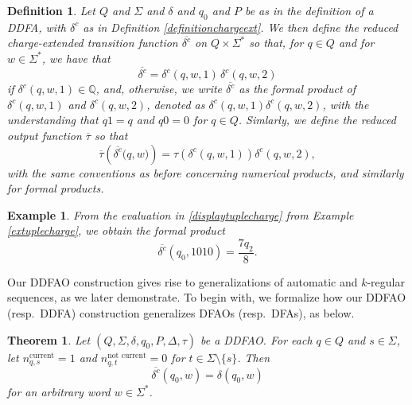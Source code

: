 \documentclass[12pt]{article}
\newtheorem{theorem}{Theorem}
\newtheorem{definition}{Definition}
\newtheorem{example}{Example}
\begin{document}
\begin{definition}\label{reduceddefinition}
 Let $Q$ and $\Sigma$ and $\delta$ and $q_0$ and $P$ be as in the definition of a DDFA, with $\delta^{c}$ as in Definition 
 \ref{definitionchargeext}. We then define the \emph{reduced charge-extended transition function} $\overline{\delta^{c}}$ on $Q 
 \times \Sigma^{\ast}$ so that, for $q \in Q$ and for $w \in \Sigma^{\ast}$, we have that 
 $$\overline{\delta^{c}} = \delta^{c}(q, w, 1) \, \delta^{c}(q, w, 2) $$ 
 if $ \delta^{c}(q, w, 1) \in \mathbb{Q}$, 
 and, otherwise, we write 
 $\overline{\delta^{c}} $ as the formal product 
 of $ \delta^{c}(q, w, 1) $ and $\delta^{c}(q, w, 2)$, denoted as 
 $ \delta^{c}(q, w, 1) \delta^{c}(q, w, 2)$, 
 with the understanding that $q 1 = q$ and $q 0 = 0$ for $q \in Q$. 
 Simlarly, we define the \emph{reduced output function}
 $\overline{\tau}$ so that
 $$ \overline{\tau}\left( \overline{\delta^{c}}\big( q, w \big) \right) 
 = \tau\left( \delta^{c}(q, w, 1) \right) \delta^{c}(q, w, 2), $$
 with the same conventions as before concerning numerical products, and similarly for formal products. 
\end{definition}

\begin{example}
 From the evaluation in \eqref{displaytuplecharge} from Example \ref{extuplecharge}, we obtain the formal product 
\begin{equation*}
 \overline{\delta^{c}}(q_0, 1010) = \frac{7q_2}{8}. 
\end{equation*}
\end{example}

 Our DDFAO construction gives rise to generalizations of automatic and $k$-regular sequences, 
 as we later demonstrate. 
 To begin with, we formalize how 
 our DDFAO (resp.\ DDFA) construction generalizes DFAOs (resp.\ DFAs), as below. 

\begin{theorem}\label{theoremmainformalize}
 Let $(Q, \Sigma, \delta, q_0, P, \Delta, \tau)$ be a DDFAO. For each $q \in Q$ and $s \in \Sigma$, let 
 $ n^{\text{current}}_{q, s} = 1$ and 
 $n_{q, t}^{\text{not current}} = 0$ for $t \in \Sigma \setminus \{ s \}$. Then 
\begin{equation}\label{20250612153PM1A}
 \overline{\delta^{c}}(q_0, w) = \delta(q_0, w) 
\end{equation}
 for an arbitrary word $w \in \Sigma^{\ast}$. 
\end{theorem}
\end{document}
